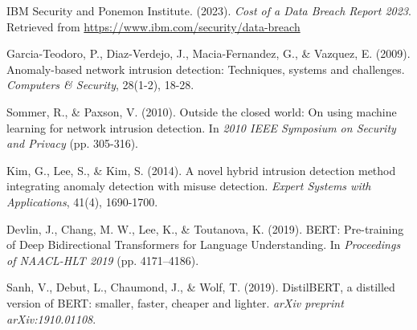 \documentclass[12pt]{article}
\begin{document}
\begin{thebibliography}{9}

IBM Security and Ponemon Institute. (2023).
\newblock \emph{Cost of a Data Breach Report 2023}.
\newblock Retrieved from \url{https://www.ibm.com/security/data-breach}

Garcia-Teodoro, P., Diaz-Verdejo, J., Macia-Fernandez, G., \& Vazquez, E. (2009).
\newblock Anomaly-based network intrusion detection: Techniques, systems and challenges.
\newblock \emph{Computers \& Security}, 28(1-2), 18-28.

Sommer, R., \& Paxson, V. (2010).
\newblock Outside the closed world: On using machine learning for network intrusion detection.
\newblock In \emph{2010 IEEE Symposium on Security and Privacy} (pp. 305-316).

Kim, G., Lee, S., \& Kim, S. (2014).
\newblock A novel hybrid intrusion detection method integrating anomaly detection with misuse detection.
\newblock \emph{Expert Systems with Applications}, 41(4), 1690-1700.

Devlin, J., Chang, M. W., Lee, K., \& Toutanova, K. (2019).
\newblock BERT: Pre-training of Deep Bidirectional Transformers for Language Understanding.
\newblock In \emph{Proceedings of NAACL-HLT 2019} (pp. 4171–4186).

Sanh, V., Debut, L., Chaumond, J., \& Wolf, T. (2019).
\newblock DistilBERT, a distilled version of BERT: smaller, faster, cheaper and lighter.
\newblock \emph{arXiv preprint arXiv:1910.01108}.

\end{thebibliography}
\end{document}
